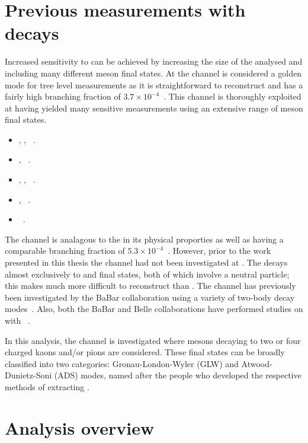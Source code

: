\section{Previous \Pgamma measurements with  decays}

Increased sensitivity to \Pgamma can be achieved by increasing the size of the \dataset analysed and including many different \D meson final states. At \lhcb the \decay{\Bm}{\D\Km} channel is considered a golden mode for tree level \Pgamma measurements as it is straightforward to reconstruct and has a fairly high branching fraction of $3.7 \times 10^{-4}$~\cite{PDG2016}. This \decay{\Bm}{\D\Km} channel is thoroughly exploited at \lhcb having yielded many \Pgamma sensitive measurements using an extensive range of \D meson final states.
\begin{itemize}
\item \decay{\D}{\Kp\pim}, \Kp\Km, \pip\pim~\cite{LHCb-PAPER-2017-021}.
\item \decay{\D}{\Kp\pim\pip\pim}, \pip\pim\pip\pim~\cite{LHCb-PAPER-2016-003}.
\item \decay{\D}{\Kp\pim\piz}, \Kp\Km\piz, \pip\pim\piz~\cite{LHCb-PAPER-2015-014}.
\item \decay{\D}{\KS\Kp\Km}, \KS\pip\pim~\cite{LHCb-PAPER-2014-041}.
\item \decay{\D}{\KS\Kp\Km}~\cite{LHCb-PAPER-2013-068}.
\end{itemize}

The \decay{\Bm}{\D\Kstarm} channel is analagous to the \decay{\Bm}{\D\Km} in its physical proporties as well as having a comparable branching fraction of $5.3 \times 10^{-4}$~\cite{PDG2016}. However, prior to the work presented in this thesis the \decay{\Bm}{\D\Kstarm} channel had not been investigated at \lhcb. The \Kstarm decays almost exclusively to \KS\pim and \Km\piz final states, both of which involve a neutral particle; this makes \decay{\Bm}{\D\Kstarm} much more difficult to reconstruct than \decay{\Bm}{\D\Km}. The \decay{\Bm}{\D\Kstarm} channel has previously been investigated by the BaBar collaboration using a variety of two-body \D decay modes~\cite{BaBarDKstar}. Also, both the BaBar and Belle collaborations have performed studies on \decay{\Bm}{\D\Kstarm} with \decay{\D}{\KS\pip\pim}~\cite{BaBarGGSZ,BelleGGSZ}.

In this analysis, the \decay{\Bm}{\D\Kstarm} channel is investigated where \D mesons decaying to two or four charged kaons and/or pions are considered. These final states can be broadly classified into two categories: Gronau-London-Wyler (GLW) and Atwood-Dunietz-Soni (ADS) modes, named after the people who developed the respective methods of extracting \Pgamma.

\section{Analysis overview}
